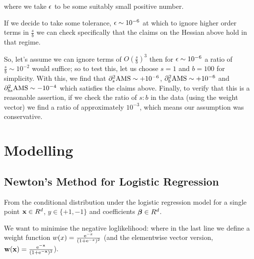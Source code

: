 \begin{appendices}


where we take $\epsilon$ to be some suitably small positive number.

If we decide to take some tolerance, $\epsilon \sim 10^{-6}$ at which to ignore higher order terms in $\frac{s}{b}$ we can check specifically that the claims on the Hessian above hold in that regime.

So, let's assume we can ignore terms of $O(\frac{s}{b})^3$ then for $\epsilon\sim 10^{-6}$ a ratio of $\frac{s}{b}\sim 10^{-2}$ would suffice; so to test this, let us choose $s=1$ and $b=100$ for simplicity.
With this, we find that $\partial_s^2\rm{AMS} \sim +10^{-6}$, $\partial_b^2\rm{AMS} \sim +10^{-6}$ and $\partial_{bs}^2\rm{AMS} \sim -10^{-4}$ which satisfies the claims above.
Finally, to verify that this is a reasonable assertion, if we check the ratio of $s:b$ in the data (using the weight vector) we find a ratio of approximately $10^{-3}$, which means our assumption was conservative. 


\section{Modelling}

\subsection{Newton's Method for Logistic Regression}
\label{appendix:newton_lr}
From the conditional distribution under the logistic regression model for a single point $\mathbf{x} \in R^d$, $y \in \{+1,-1\}$ and coefficients $\bm{\beta} \in R^d$.

We want to minimise the negative loglikelihood:
where in the last line we define a weight function $w(x) = \frac{\mathrm{e}^{-x}}{(1+\mathrm{e}^{-x})^2}$ (and the elementwise vector version, $\mathbf{w}(\mathbf{x}) = \frac{\mathrm{e}^{-\mathbf{x}}}{(1+\mathrm{e}^{-\mathbf{x}})^2}$).


\end{appendices}
